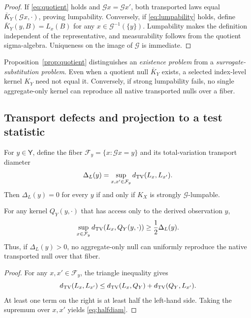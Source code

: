 \begin{proof}
If \eqref{eq:quotient} holds and $\mathcal Gx=\mathcal Gx'$, both transported laws equal $\bar K_Y(\mathcal Gx,\cdot)$, proving lumpability. Conversely, if \eqref{eq:lumpability} holds, define $\bar K_Y(y,B)=L_x(B)$ for any $x\in\mathcal G^{-1}(\{y\})$. Lumpability makes the definition independent of the representative, and measurability follows from the quotient sigma-algebra. Uniqueness on the image of $\mathcal G$ is immediate.
\end{proof}

Proposition~\ref{prop:quotient} distinguishes an \emph{existence problem} from a \emph{surrogate-substitution problem}. Even when a quotient null $\bar K_Y$ exists, a selected index-level kernel $K_Y$ need not equal it. Conversely, if strong lumpability fails, no single aggregate-only kernel can reproduce all native transported nulls over a fiber.

\subsection{Transport defects and projection to a test statistic}\label{sec:defects}

For $y\in\mathsf Y$, define the fiber $\mathcal F_y=\{x:\mathcal Gx=y\}$ and its total-variation transport diameter
\begin{equation}
\Delta_L(y)=\sup_{x,x'\in\mathcal F_y}d_{\mathrm{TV}}(L_x,L_{x'}).
\label{eq:DeltaL}
\end{equation}
Then $\Delta_L(y)=0$ for every $y$ if and only if $K_X$ is strongly $\mathcal G$-lumpable.

\begin{proposition}\label{prop:halfdiam}
For any kernel $Q_Y(y,\cdot)$ that has access only to the derived observation $y$,
\begin{equation}
\sup_{x\in\mathcal F_y}d_{\mathrm{TV}}\!\left(L_x,Q_Y(y,\cdot)\right)
\ge \frac12\Delta_L(y).
\label{eq:halfdiam}
\end{equation}
Thus, if $\Delta_L(y)>0$, no aggregate-only null can uniformly reproduce the native transported null over that fiber.
\end{proposition}

\begin{proof}
For any $x,x'\in\mathcal F_y$, the triangle inequality gives
\[
d_{\mathrm{TV}}(L_x,L_{x'})\le d_{\mathrm{TV}}(L_x,Q_Y)+d_{\mathrm{TV}}(Q_Y,L_{x'}).
\]
At least one term on the right is at least half the left-hand side. Taking the supremum over $x,x'$ yields \eqref{eq:halfdiam}.
\end{proof}

